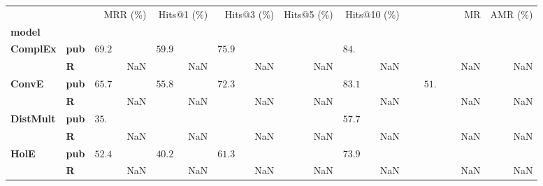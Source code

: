 \begin{tabular}{llrrrrrrr}
\toprule
       &   &                    MRR (\%) &                 Hits@1 (\%) &                  Hits@3 (\%) & Hits@5 (\%) &                 Hits@10 (\%) &                                        MR & AMR (\%) \\
\textbf{model} & {} &                             &                             &                              &             &                              &                                           &          \\
\midrule
\textbf{ComplEx} & \textbf{pub} &  $69.2\phantom{0 \pm 0.00}$ &  $59.9\phantom{0 \pm 0.00}$ &  $75.9\phantom{0 \pm 00.00}$ &             &  $84.\phantom{00 \pm 00.00}$ &                                           &          \\
       & \textbf{R} &                         NaN &                         NaN &                          NaN &         NaN &                          NaN &                                       NaN &      NaN \\\midrule
\textbf{ConvE} & \textbf{pub} &  $65.7\phantom{0 \pm 0.00}$ &  $55.8\phantom{0 \pm 0.00}$ &  $72.3\phantom{0 \pm 00.00}$ &             &  $83.1\phantom{0 \pm 00.00}$ &  $\phantom{000}51.\phantom{00 \pm 00.00}$ &          \\
       & \textbf{R} &                         NaN &                         NaN &                          NaN &         NaN &                          NaN &                                       NaN &      NaN \\\midrule
\textbf{DistMult} & \textbf{pub} &  $35.\phantom{00 \pm 0.00}$ &                             &                              &             &  $57.7\phantom{0 \pm 00.00}$ &                                           &          \\
       & \textbf{R} &                         NaN &                         NaN &                          NaN &         NaN &                          NaN &                                       NaN &      NaN \\\midrule
\textbf{HolE} & \textbf{pub} &  $52.4\phantom{0 \pm 0.00}$ &  $40.2\phantom{0 \pm 0.00}$ &  $61.3\phantom{0 \pm 00.00}$ &             &  $73.9\phantom{0 \pm 00.00}$ &                                           &          \\
       & \textbf{R} &                         NaN &                         NaN &                          NaN &         NaN &                          NaN &                                       NaN &      NaN \\\midrule

\end{tabular}
